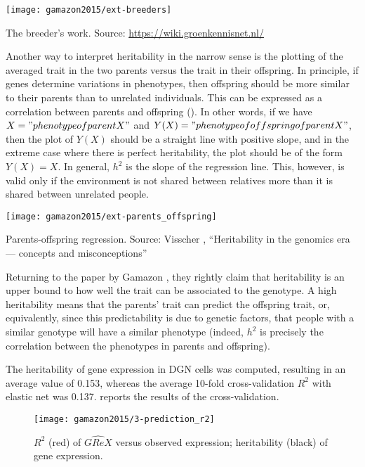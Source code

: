 \documentclass[../main.tex]{subfiles}
\begin{document}
\begin{marginfigure}
	\texttt{[image: gamazon2015/ext-breeders]}
	\caption{The breeder's work. Source: 
\url{https://wiki.groenkennisnet.nl/}}
\end{marginfigure}

Another way to interpret heritability in the narrow sense is the 
plotting of the averaged trait in the two parents versus the trait in 
their offspring. In principle, if genes determine variations in 
phenotypes, then offspring should be more similar to their parents than 
to unrelated individuals. This can be expressed as a correlation between 
parents and offspring (). In other words, if 
we have $X = "phenotype of parent X"$ and $Y(X) = "phenotype of 
offspring of parent X"$, then the plot of $Y(X)$ should be a straight 
line with positive slope, and in the extreme case where there is perfect 
heritability, the plot should be of the form $Y(X) = X$. In general, 
$h^2$ is the slope of the regression line. This, however, is valid only 
if the environment is not shared between relatives more than it is 
shared between unrelated people.

\begin{marginfigure}
	\texttt{[image: gamazon2015/ext-parents\_offspring]}
	\caption{Parents-offspring regression. Source: Visscher , 
\enquote{Heritability in the genomics era — concepts and 
misconceptions}}
\end{marginfigure}

Returning to the paper by Gamazon \etal, they rightly claim that 
heritability is an upper bound to how well the trait can be associated 
to the genotype. A high heritability means that the parents' trait can 
predict the offspring trait, or, equivalently, since this predictability 
is due to genetic factors, that people with a similar genotype will have 
a similar phenotype (indeed, $h^2$ is precisely the correlation between 
the phenotypes in parents and offspring).

The heritability of gene expression in DGN cells was computed, resulting 
in an average value of 0.153, whereas the average 10-fold 
cross-validation $R^2$ with elastic net was 0.137. 
 reports the results of the cross-validation.

\begin{figure}
	\texttt{[image: gamazon2015/3-prediction\_r2]}
	\caption{$R^2$ (red) of $\widehat{GReX}$ versus observed expression; 
heritability (black) of gene expression.}
\end{figure}
\end{document}
